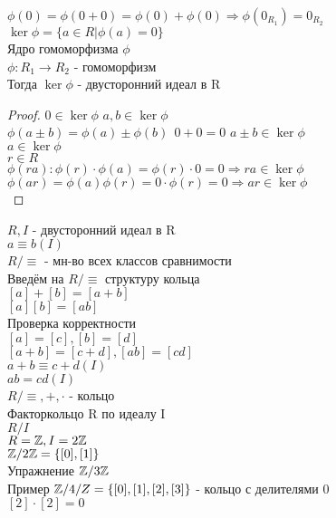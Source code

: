 $ \phi(0) = \phi(0+0) = \phi(0) + \phi(0) \Rightarrow \phi(0_{R_1}) = 0_{R_2} $\\
$ \ker \phi = \{ a \in R | \phi(a) = 0 \} $\\
Ядро гомоморфизма $ \phi $ \\
$  \phi : R_1 \rightarrow R_2 $ - гомоморфизм \\
Тогда $ \ker \phi $ - двусторонний идеал в R \\
\begin{proof}
	$ 0 \in \ker \phi $
	$ a, b \in \ker \phi $ \\
	$ \phi (a \pm b) = \phi(a) \pm \phi(b) \ \ 0+0=0$
	$ a \pm b \in  \ker \phi $\\
	$ a \in \ker \phi $ \\
	$ r \in R$ \\
	$ \phi(ra) : \phi(r) \cdot \phi(a) = \phi(r) \cdot 0 = 0 \Rightarrow ra \in \ker \phi $\\
	$ \phi (ar) = \phi(a) \phi(r) = 0 \cdot \phi(r) = 0 \Rightarrow ar \in \ker \phi $\\ 
\end{proof}


$ R, I $ - двусторонний идеал в R \\
$ a \equiv b (I) $\\
$ R / \equiv $ - мн-во всех классов сравнимости \\
Введём на $ R/\equiv $ структуру кольца \\
$ [a] + [b] = [a+b] $\\
$ [a][b] = [ab] $\\
Проверка корректности \\
$ [a] = [c], [b] = [d] $ \\
$ [a+b] = [c+d], [ab] = [cd] $\\
$ a+b \equiv c+d(I) $\\
$ ab = cd (I) $\\
$ R / \equiv, +, \cdot  $ - кольцо \\
Факторкольцо R по идеалу I \\
$ R / I $ \\
$ R = \mathbb{Z} , I = 2\mathbb{Z} $ \\
$ \mathbb{Z} / 2\mathbb{Z} = \{ [0], [1] \} $ \\
Упражнение $ \mathbb{Z} / 3\mathbb{Z} $ \\
Пример $ \mathbb{Z} / 4/Z = \{ [0], [1], [2], [3] \} $ - кольцо с делителями 0 \\
$ [2] \cdot [2] = 0 $ 

